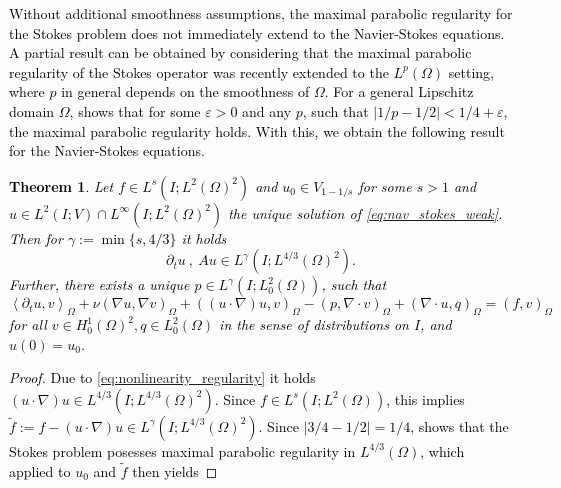 \documentclass{m2an}
\newcommand\blue[1]{\textcolor{black}{#1}}
\newtheorem{theorem}{Theorem}[section]
\newcommand{\Oprod}[1]{\left( #1 \right)_{\Omega}}
\newcommand{\Opair}[1]{\left\langle #1 \right\rangle_{\Omega}}
\begin{document}
%
\blue{Without additional smoothness assumptions, the maximal parabolic regularity for the Stokes problem
  does not immediately extend to the Navier-Stokes equations. A partial result can be obtained by 
  considering that the maximal parabolic regularity of the 
  Stokes operator was recently extended to the $L^p(\Omega)$ setting, where $p$ in general depends
  on the smoothness of $\Omega$. For a general Lipschitz domain $\Omega$, \cite[Theorem 1.6]{gabel_stokes_2022}
  shows that for some $\varepsilon > 0$ and any $p$, such that $|1/p - 1/2| < 1/4 + \varepsilon$,
  the maximal parabolic regularity holds. With this, we obtain the following result for the Navier-Stokes
  equations.
  \begin{theorem}\label{thm:exist_pressure}
    Let $f \in L^s(I;L^2(\Omega)^2)$ and $u_0 \in V_{1-1/s}$ for some $s>1$ and 
    $u \in L^2(I;V)\cap L^\infty(I;L^2(\Omega)^2)$ the unique solution of \eqref{eq:nav_stokes_weak}.
    Then for $\gamma := \min \{s,4/3\}$ it holds
    \begin{equation*}
      \partial_t u \ , \ A u \in L^\gamma(I;L^{4/3}(\Omega)^2).
    \end{equation*}
    Further, there exists a unique $p \in L^\gamma(I;L^2_0(\Omega))$,  such that
  \begin{equation*}%
    \Opair{ \partial_t u,v} + \nu\Oprod{\nabla u, \nabla v} + \Oprod{(u\cdot \nabla)u,v} 
    - \Oprod{p,\nabla \cdot v} + \Oprod{\nabla \cdot u,q}
    = \Oprod{f,v} 
  \end{equation*}
  for all $v \in H^1_0(\Omega)^2, q \in L^2_0(\Omega)$
  in the sense of distributions on $I$, and $u(0) = u_0$.
\end{theorem}
\begin{proof}
Due to \eqref{eq:nonlinearity_regularity} it holds $(u\cdot \nabla)u \in L^{4/3}(I;L^{4/3}(\Omega)^2)$.
Since $f \in L^s(I;L^2(\Omega))$, this implies 
$\tilde f := f - (u\cdot \nabla) u \in L^\gamma(I;L^{4/3}(\Omega)^2)$.
Since $|3/4 - 1/2| = 1/4$, \cite[Theorem 1.6]{gabel_stokes_2022} shows that the Stokes problem posesses 
maximal parabolic regularity in $L^{4/3}(\Omega)$,
which applied to $u_0$ and $\tilde f$ then yields

\end{proof}}
\end{document}
